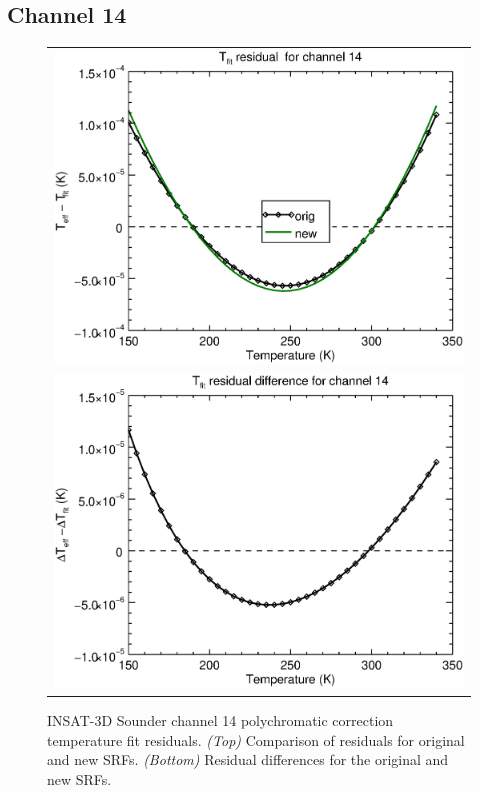 \subsection{Channel 14}
\begin{figure}[H]
  \centering
  \begin{tabular}{c}
    \includegraphics[scale=0.55]{graphics/sndr/tfit/sndr_insat3d-14.tfit.eps} \\
    \includegraphics[scale=0.55]{graphics/sndr/tfit/sndr_insat3d-14.tfit.difference.eps}
  \end{tabular}
  \caption{INSAT-3D Sounder channel 14 polychromatic correction temperature fit residuals. \emph{(Top)} Comparison of residuals for original and new SRFs. \emph{(Bottom)} Residual differences for the original and new SRFs.}
  \label{fig:sndr_ch14_tfit}
\end{figure}

